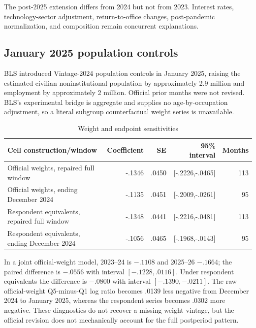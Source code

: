 The post-2025 extension differs from 2024 but not from 2023. Interest rates, technology-sector adjustment, return-to-office changes, post-pandemic normalization, and composition remain concurrent explanations.

\subsection{January 2025 population controls}

BLS introduced Vintage-2024 population controls in January 2025, raising the estimated civilian noninstitutional population by approximately 2.9 million and employment by approximately 2 million. Official prior months were not revised. BLS's experimental bridge is aggregate and supplies no age-by-occupation adjustment, so a literal subgroup counterfactual weight series is unavailable.

\begin{table}[htbp]
\centering
\caption{Weight and endpoint sensitivities}\label{tab:appweights}
\small
\begin{tabularx}{\textwidth}{Yrrrr}
\toprule
Cell construction/window & Coefficient & SE & 95\% interval & Months \\
\midrule
Official weights, repaired full window & -.1346 & .0450 & [-.2226,-.0465] & 113 \\
Official weights, ending December 2024 & -.1135 & .0451 & [-.2009,-.0261] & 95 \\
Respondent equivalents, repaired full window & -.1348 & .0441 & [-.2216,-.0481] & 113 \\
Respondent equivalents, ending December 2024 & -.1056 & .0465 & [-.1968,-.0143] & 95 \\
\bottomrule
\end{tabularx}
\end{table}

In a joint official-weight model, 2023--24 is $-.1108$ and 2025--26 $-.1664$; the paired difference is $-.0556$ with interval $[-.1228,.0116]$. Under respondent equivalents the difference is $-.0800$ with interval $[-.1390,-.0211]$. The raw official-weight Q5-minus-Q1 log ratio becomes .0139 less negative from December 2024 to January 2025, whereas the respondent series becomes .0302 more negative. These diagnostics do not recover a missing weight vintage, but the official revision does not mechanically account for the full postperiod pattern.
\FloatBarrier
